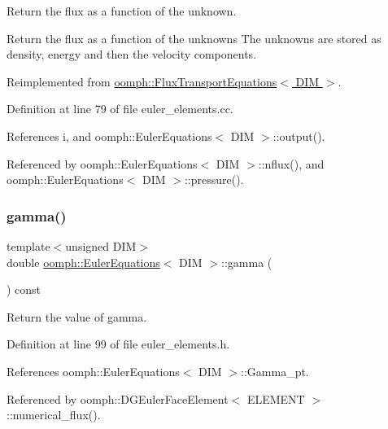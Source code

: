 Return the flux as a function of the unknown. 

Return the flux as a function of the unknowns The unknowns are stored as density, energy and then the velocity components. 

Reimplemented from \hyperlink{classoomph_1_1FluxTransportEquations_ab6ed40337620462e5c6e992081c1612a}{oomph\+::\+Flux\+Transport\+Equations$<$ D\+I\+M $>$}.



Definition at line 79 of file euler\+\_\+elements.\+cc.



References i, and oomph\+::\+Euler\+Equations$<$ D\+I\+M $>$\+::output().



Referenced by oomph\+::\+Euler\+Equations$<$ D\+I\+M $>$\+::nflux(), and oomph\+::\+Euler\+Equations$<$ D\+I\+M $>$\+::pressure().

\mbox{\label{classoomph_1_1EulerEquations_a51f474519ebab18d4b8504fa4b414d16}} 
\subsubsection{\texorpdfstring{gamma()}{gamma()}}
{\footnotesize\ttfamily template$<$unsigned D\+IM$>$ \\
double \hyperlink{classoomph_1_1EulerEquations}{oomph\+::\+Euler\+Equations}$<$ D\+IM $>$\+::gamma (\begin{DoxyParamCaption}{ }\end{DoxyParamCaption}) const\hspace{0.3cm}{\ttfamily [inline]}}



Return the value of gamma. 



Definition at line 99 of file euler\+\_\+elements.\+h.



References oomph\+::\+Euler\+Equations$<$ D\+I\+M $>$\+::\+Gamma\+\_\+pt.



Referenced by oomph\+::\+D\+G\+Euler\+Face\+Element$<$ E\+L\+E\+M\+E\+N\+T $>$\+::numerical\+\_\+flux().

\mbox{\label{classoomph_1_1EulerEquations_a51c9ada4af6c82571e76493ff3c377b9}} 
